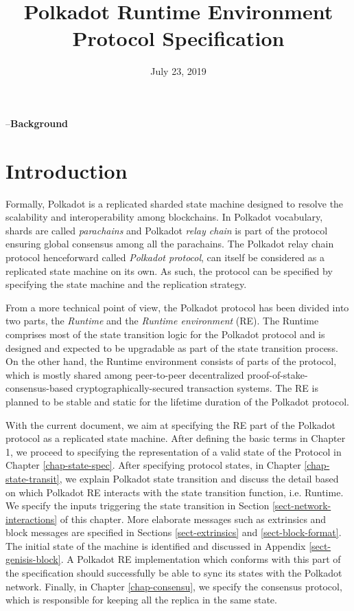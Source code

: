 \documentclass{article}
\newcommand{\chapter}[1]{\medskip\bigskip--\noindent\textbf{\huge #1}}
\newcommand{\tmem}[1]{{\em #1\/}}
\newcommand{\tmtextit}[1]{{\itshape{#1}}}
\providecommand{\tmem}[1]{\tmtextit{#1}}
\providecommand{\tmtextit}[1]{\tmtextit{#1}}
\begin{document}
\title{
  Polkadot Runtime Environment\\
  {\Large Protocol Specification}
}

\date{July 23, 2019}

\maketitle

\chapter{Background}

\section{Introduction}

Formally, Polkadot is a replicated sharded state machine designed to resolve
the scalability and interoperability among blockchains. In Polkadot
vocabulary, shards are called {\tmem{parachains}} and Polkadot {\tmem{relay
chain}} is part of the protocol ensuring global consensus among all the
parachains. The Polkadot relay chain protocol henceforward called
{\tmem{Polkadot protocol}}, can itself be considered as a replicated state
machine on its own. As such, the protocol can be specified by specifying the
state machine and the replication strategy.

From a more technical point of view, the Polkadot protocol has been divided
into two parts, the {\tmem{Runtime}} and the {\tmem{Runtime environment}}
(RE). The Runtime comprises most of the state transition logic for the
Polkadot protocol and is designed and expected to be upgradable as part of the
state transition process. On the other hand, the Runtime environment consists
of parts of the protocol, which is mostly shared among peer-to-peer
decentralized proof-of-stake-consensus-based cryptographically-secured
transaction systems. The RE is planned to be stable and static for the
lifetime duration of the Polkadot protocol.

With the current document, we aim at specifying the RE part of the Polkadot
protocol as a replicated state machine. After defining the basic terms in
Chapter 1, we proceed to specifying the representation of a valid state of the
Protocol in Chapter \ref{chap-state-spec}. After specifying protocol states,
in Chapter \ref{chap-state-transit}, we explain Polkadot state transition and
discuss the detail based on which Polkadot RE interacts with the state
transition function, i.e. Runtime. We specify the inputs triggering the state
transition in Section \ref{sect-network-interactions} of this chapter. More
elaborate messages such as extrinsics and block messages are specified in
Sections \ref{sect-extrinsics} and \ref{sect-block-format}. The initial state
of the machine is identified and discussed in Appendix
\ref{sect-genisis-block}. A Polkadot RE implementation which conforms with
this part of the specification should successfully be able to sync its states
with the Polkadot network. Finally, in Chapter \ref{chap-consensu}, we specify
the consensus protocol, which is responsible for keeping all the replica in
the same state.
\end{document}
